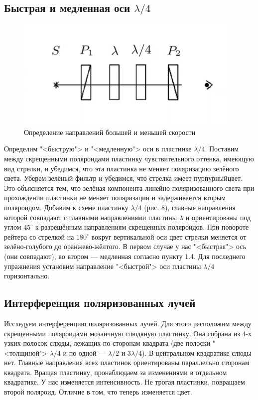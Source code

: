 \documentclass[a4paper,12pt]{article}
\begin{document}
\newpage

\subsection{Быстрая и медленная оси $ \lambda/4 $}

\begin{figure}
	\includegraphics[width=\linewidth]{8}
	\caption{Определение направлений
большей и меньшей скорости}
	\label{ris 8}
\end{figure}

Определим "<быструю"> и "<медленную"> оси в пластинке $ \lambda/4 $. Поставим между скрещенными поляроидами пластинку чувствительного оттенка, имеющую вид стрелки, и убедимся, что эта пластинка не меняет поляризацию зелёного света. Уберем зелёный фильтр и убедимся, что стрелка имеет пурпурныйцвет. Это объясняется тем, что зелёная компонента линейно поляризованного света при прохождении пластинки не меняет поляризации и задерживается вторым поляроидом. Добавим к схеме пластинку $ \lambda/4 $ (рис. 8), главные направления которой совпадают с главными направлениями пластины $ \lambda $ и ориентированы под углом $ 45^\circ $ к разрешённым направлениям скрещенных поляроидов. При повороте рейтера со стрелкой на $ 180^\circ $ вокруг вертикальной оси цвет стрелки меняется от зелёно-голубого до оранжево-жёлтого. В первом случае у нас "<быстрая"> ось (они совпадают), во втором --- медленная согласно пункту 1.4. Для последнего упражнения установим направление "<быстрой"> оси пластины $ \lambda/4 $ горизонтально.

\subsection{Интерференция поляризованных лучей}

Исследуем интерференцию поляризованных лучей. Для этого расположим между скрещенными поляроидами мозаичную слюдяную пластинку. Она собрана из 4-х узких полосок слюды, лежащих по сторонам квадрата (две полоски "<толщиной"> $ \lambda/4 $ и по одной --- $ \lambda/2 $ и $ 3\lambda/4 $). В центральном квадратике слюды нет. Главные направления всех пластинок ориентированы параллельно сторонам квадрата. Вращая пластинку, пронаблюдаем за изменениями в отдельном квадратике. У нас изменяется интенсивность.  Не трогая пластинки, повращаем второй поляроид. Отличие в том, что теперь изменяется цвет.
\end{document}
